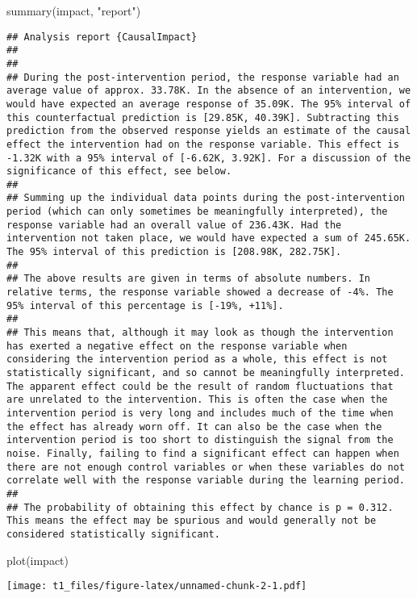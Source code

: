 \documentclass[
]{article}
\newenvironment{Shaded}{\begin{snugshade}}{\end{snugshade}}
\newcommand{\FunctionTok}[1]{\textcolor[rgb]{0.00,0.00,0.00}{#1}}
\newcommand{\NormalTok}[1]{#1}
\newcommand{\StringTok}[1]{\textcolor[rgb]{0.31,0.60,0.02}{#1}}
\begin{document}
\begin{Shaded}
\begin{Highlighting}[]
\FunctionTok{summary}\NormalTok{(impact, }\StringTok{"report"}\NormalTok{)}
\end{Highlighting}
\end{Shaded}

\begin{verbatim}
## Analysis report {CausalImpact}
## 
## 
## During the post-intervention period, the response variable had an average value of approx. 33.78K. In the absence of an intervention, we would have expected an average response of 35.09K. The 95% interval of this counterfactual prediction is [29.85K, 40.39K]. Subtracting this prediction from the observed response yields an estimate of the causal effect the intervention had on the response variable. This effect is -1.32K with a 95% interval of [-6.62K, 3.92K]. For a discussion of the significance of this effect, see below.
## 
## Summing up the individual data points during the post-intervention period (which can only sometimes be meaningfully interpreted), the response variable had an overall value of 236.43K. Had the intervention not taken place, we would have expected a sum of 245.65K. The 95% interval of this prediction is [208.98K, 282.75K].
## 
## The above results are given in terms of absolute numbers. In relative terms, the response variable showed a decrease of -4%. The 95% interval of this percentage is [-19%, +11%].
## 
## This means that, although it may look as though the intervention has exerted a negative effect on the response variable when considering the intervention period as a whole, this effect is not statistically significant, and so cannot be meaningfully interpreted. The apparent effect could be the result of random fluctuations that are unrelated to the intervention. This is often the case when the intervention period is very long and includes much of the time when the effect has already worn off. It can also be the case when the intervention period is too short to distinguish the signal from the noise. Finally, failing to find a significant effect can happen when there are not enough control variables or when these variables do not correlate well with the response variable during the learning period.
## 
## The probability of obtaining this effect by chance is p = 0.312. This means the effect may be spurious and would generally not be considered statistically significant.
\end{verbatim}

\begin{Shaded}
\begin{Highlighting}[]
\FunctionTok{plot}\NormalTok{(impact)}
\end{Highlighting}
\end{Shaded}

\texttt{[image: t1\_files/figure-latex/unnamed-chunk-2-1.pdf]}
\end{document}
